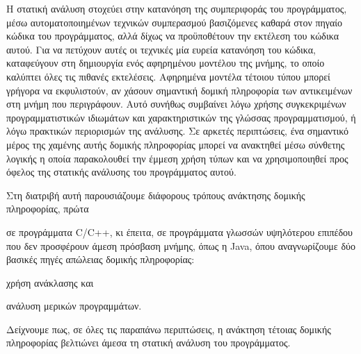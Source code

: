 
Η στατική ανάλυση στοχεύει στην κατανόηση της συμπεριφοράς του
προγράμματος, μέσω αυτοματοποιημένων τεχνικών συμπερασμού βασιζόμενες
καθαρά στον πηγαίο κώδικα του προγράμματος, αλλά δίχως να προϋποθέτουν
την εκτέλεση του κώδικα αυτού. Για να πετύχουν αυτές οι τεχνικές μία
ευρεία κατανόηση του κώδικα, καταφεύγουν στη δημιουργία ενός
αφηρημένου μοντέλου της μνήμης, το οποίο καλύπτει όλες τις πιθανές
εκτελέσεις. Αφηρημένα μοντέλα τέτοιου τύπου μπορεί γρήγορα να
εκφυλιστούν, αν χάσουν σημαντική δομική πληροφορία των αντικειμένων
στη μνήμη που περιγράφουν. Αυτό συνήθως συμβαίνει λόγω χρήσης
συγκεκριμένων προγραμματιστικών ιδιωμάτων και χαρακτηριστικών της
γλώσσας προγραμματισμού, ή λόγω πρακτικών περιορισμών της ανάλυσης.
Σε αρκετές περιπτώσεις, ένα σημαντικό μέρος της χαμένης αυτής δομικής
πληροφορίας μπορεί να ανακτηθεί μέσω σύνθετης λογικής η οποία
παρακολουθεί την έμμεση χρήση τύπων και να χρησιμοποιηθεί προς όφελος
της στατικής ανάλυσης του προγράμματος αυτού.

Στη διατριβή αυτή παρουσιάζουμε διάφορους τρόπους ανάκτησης δομικής
πληροφορίας, πρώτα
\begin{inparaenum}[(1)]
\item σε προγράμματα {\en C/C++}, κι έπειτα, σε προγράμματα γλωσσών
  υψηλότερου επιπέδου που δεν προσφέρουν άμεση πρόσβαση μνήμης, όπως η
  {\en Java}, όπου αναγνωρίζουμε δύο βασικές πηγές απώλειας δομικής
  πληροφορίας:
\item χρήση ανάκλασης και
\item ανάλυση μερικών προγραμμάτων.
\end{inparaenum}
Δείχνουμε πως, σε όλες τις παραπάνω περιπτώσεις, η ανάκτηση τέτοιας
δομικής πληροφορίας βελτιώνει άμεσα τη στατική ανάλυση του
προγράμματος.

